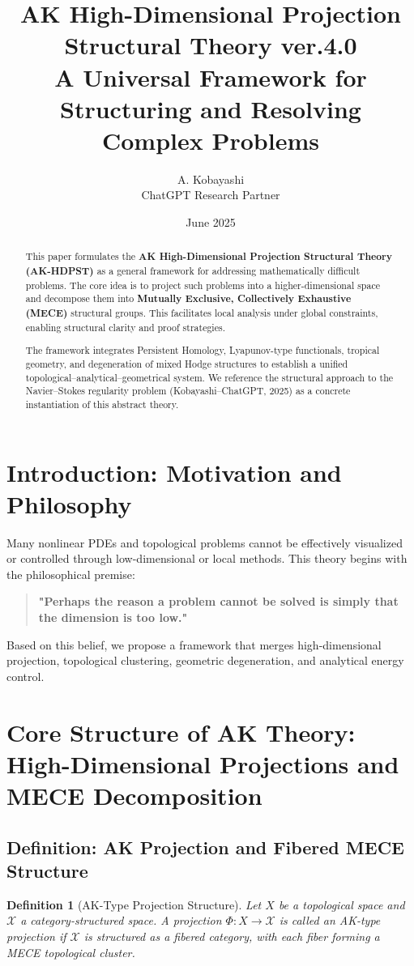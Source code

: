 \documentclass[11pt]{article}
\title{AK High-Dimensional Projection Structural Theory ver.4.0\\ \large A Universal Framework for Structuring and Resolving Complex Problems}
\author{A. Kobayashi \\ ChatGPT Research Partner}
\date{June 2025}
\newtheorem{definition}[theorem]{Definition}
\begin{document}
\maketitle

\begin{abstract}
This paper formulates the \textbf{AK High-Dimensional Projection Structural Theory (AK-HDPST)} as a general framework for addressing mathematically difficult problems. The core idea is to project such problems into a higher-dimensional space and decompose them into \textbf{Mutually Exclusive, Collectively Exhaustive (MECE)} structural groups. This facilitates local analysis under global constraints, enabling structural clarity and proof strategies. 

The framework integrates Persistent Homology, Lyapunov-type functionals, tropical geometry, and degeneration of mixed Hodge structures to establish a unified topological–analytical–geometrical system. We reference the structural approach to the Navier–Stokes regularity problem (Kobayashi–ChatGPT, 2025) as a concrete instantiation of this abstract theory.
\end{abstract}

\tableofcontents

\section{Introduction: Motivation and Philosophy}
Many nonlinear PDEs and topological problems cannot be effectively visualized or controlled through low-dimensional or local methods. This theory begins with the philosophical premise:
\begin{quote}
\textbf{"Perhaps the reason a problem cannot be solved is simply that the dimension is too low."}
\end{quote}
Based on this belief, we propose a framework that merges high-dimensional projection, topological clustering, geometric degeneration, and analytical energy control.

\section{Core Structure of AK Theory: High-Dimensional Projections and MECE Decomposition}
\subsection{Definition: AK Projection and Fibered MECE Structure}
\begin{definition}[AK-Type Projection Structure]
Let \(X\) be a topological space and \(\mathcal{X}\) a category-structured space. A projection \(\Phi: X \to \mathcal{X}\) is called an AK-type projection if \(\mathcal{X}\) is structured as a fibered category, with each fiber forming a MECE topological cluster.
\end{definition}
\end{document}
